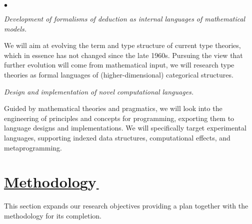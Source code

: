 \documentclass[11pt,twocolumn]{article}
\newenvironment{myitemize}
  {\begin{list}{$\bullet$}
  {\setlength{\topsep}{2pt}
   \setlength{\partopsep}{2pt}
   \setlength{\itemsep}{2.5pt}
   \setlength{\parsep}{2.5pt}
   \setlength{\leftmargin}{1em}
   \setlength{\labelwidth}{.5em}}}
  {\end{list}}
\begin{document}
\begin{myitemize}
\item[{\bfseries 3\enspace Calculi:}]\mbox{}\enspace\thinspace
%  
  \emph{Development of formalisms of deduction as internal languages of
    mathematical models.}
  
  We will aim at evolving the term and type structure of current type
  theories, which in essence has not changed since the late 1960s.  Pursuing
  the view that further evolution will come from mathematical input, we will
  research type theories as formal languages of (higher-dimensional)
  categorical structures.  

\item[{\bfseries 4\enspace Programming:}]\mbox{}\enspace\thinspace
%
  \emph{Design and implementation of novel computational languages.}

  \vspace*{.5mm}
  Guided by mathematical theories and pragmatics, we will look into the
  engineering of principles and concepts for programming, exporting them to
  language designs and implementations.  We will specifically target
  experimental languages, supporting indexed data structures, computational
  effects, and metaprogramming.  
\end{myitemize}

\section{\underline{Methodolo}gy\hspace{-1mm}\underline{\,}}
\label{MethodologySection}

This section expands our research objectives providing a plan together
with the methodology for its completion.
\end{document}
